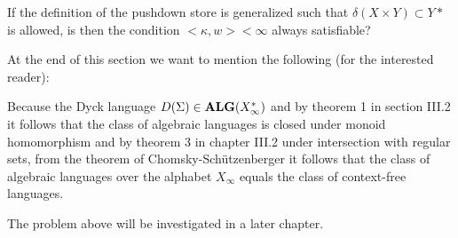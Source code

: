 If the definition of the pushdown store is generalized such that $\delta(X
\times Y) \subset Y*$ is allowed, is then the condition $<\kappa, w> <
\infty$ always satisfiable?

At the end of this section we want to mention the following (for the interested
reader):

Because the Dyck language $D(\Sigma) \in \mbox{{\bf ALG}}(X_\infty^*)$ and by theorem 1
in section III.2 it follows that the class of algebraic languages is closed
under monoid homomorphism and by theorem 3 in chapter III.2 under intersection 
with regular sets, from the theorem of Chomsky-Schützenberger it follows that
the class of algebraic languages over the alphabet $X_\infty$ equals the class 
of context-free languages.

The problem above will be investigated in a later chapter.
